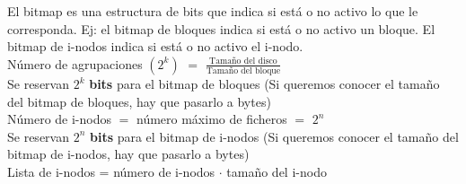 \documentclass[fleqn]{article}
\begin{document}
	El bitmap es una estructura de bits que indica si está o no activo lo que le corresponda. Ej: el bitmap de bloques indica si está o no activo un bloque. El bitmap de i-nodos indica si está o no activo el i-nodo. \\
	
	Número de agrupaciones $(2^{k})$ $=$ $\frac{\text{Tamaño del disco}}{\text{Tamaño del bloque}}$ \\
	
	Se reservan $2^{k}$ \textbf{bits} para el bitmap de bloques (Si queremos conocer el tamaño del bitmap de bloques, hay que pasarlo a bytes) \\
	
	Número de i-nodos $=$ número máximo de ficheros $=$ $2^{n}$ \\
	
	Se reservan $2^{n}$ \textbf{bits} para el bitmap de i-nodos (Si queremos conocer el tamaño del bitmap de i-nodos, hay que pasarlo a bytes) \\
	
	Lista de i-nodos = número de i-nodos $\cdot$ tamaño del i-nodo
\end{document}

